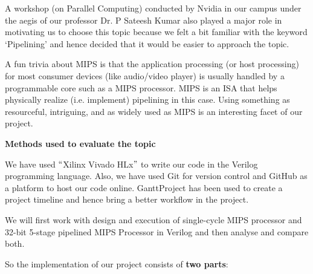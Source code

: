 \documentclass[12pt]{article}
\begin{document}
\vspace{\baselineskip}
{\fontsize{18pt}{21.6pt}\selectfont A workshop (on Parallel Computing) conducted by Nvidia in our campus under the aegis of our professor Dr. P Sateesh Kumar also played a major role in motivating us to choose this topic because we felt a bit familiar with the keyword ‘Pipelining’ and hence decided that it would be easier to approach the topic.\par}\par


\vspace{\baselineskip}
{\fontsize{18pt}{21.6pt}\selectfont A fun trivia about MIPS is that the application processing (or host processing) for most consumer devices (like audio/video player) is usually handled by a programmable core such as a MIPS processor. MIPS is an ISA that helps physically realize (i.e. implement) pipelining in this case. Using something as resourceful, intriguing, and as widely used as MIPS is an interesting facet of our project. \par}\par


\vspace{\baselineskip}

\vspace{\baselineskip}

\vspace{\baselineskip}
{\fontsize{22pt}{26.4pt}\selectfont \textbf{Methods used to evaluate the topic }\par}\par


\vspace{\baselineskip}
{\fontsize{18pt}{21.6pt}\selectfont We have used $``$Xilinx Vivado HLx$"$  to write our code in the Verilog programming language. Also, we have used Git for version control and GitHub as a platform to host our code online. GanttProject has been used to create a project timeline and hence bring a better workflow in the project.\par}\par


\vspace{\baselineskip}
{\fontsize{18pt}{21.6pt}\selectfont We will first work with design and execution of single-cycle MIPS processor and 32-bit 5-stage pipelined MIPS Processor in Verilog and then analyse and compare both.\par}\par


\vspace{\baselineskip}
{\fontsize{18pt}{21.6pt}\selectfont So the implementation of our project consists of \textbf{two parts}:\par}\par
\end{document}
